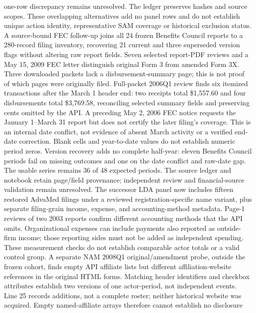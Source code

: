one-row discrepancy remains unresolved. The ledger
preserves hashes and source scopes. These overlapping alternatives add no
panel rows and do not establish unique action identity, representative SAM
coverage or historical exclusion status.
A source-bound FEC follow-up joins all 24 frozen Benefits Council reports to a
280-record filing inventory, recovering 21 current and three superseded version
flags without altering raw report fields. Seven selected report-PDF reviews and
a May 15, 2009 FEC letter distinguish original Form 3 from amended Form 3X.
Three downloaded packets lack a disbursement-summary page; this is not proof of
which pages were originally filed. Full-packet 2006Q1 review finds six itemized
transactions after the March 1 header end: two receipts total \$1,557.60 and
four disbursements total \$3,769.58, reconciling selected summary fields and
preserving cents omitted by the API. A preceding May 2, 2006 FEC notice requests
the January 1--March 31 report but does not certify the later filing's coverage.
This is an internal date conflict, not evidence of absent March activity or a
verified end-date correction. Blank cells and year-to-date values do not establish
numeric period zeros. Version recovery adds no complete half-year: eleven
Benefits Council periods fail on missing outcomes and one on the date conflict
and raw-date gap. The usable series remains 36 of 48
expected periods. The source ledger and notebook retain page/field provenance;
independent review and financial-source validation remain unresolved.
The successor LDA panel now includes fifteen restored AdvaMed filings under a
reviewed registration-specific name variant, plus separate filing-grain income,
expense, and accounting-method metadata. Page-1 reviews of two 2003 reports
confirm different accounting methods that the API omits. Organizational expenses
can include payments also reported as outside-firm income; those reporting sides
must not be added as independent spending. These measurement checks do not
establish comparable actor totals or a valid control group.
A separate NAM 2008Q1 original/amendment probe, outside the frozen cohort,
finds empty API affiliate lists but different affiliation-website references
in the original HTML forms. Matching header identifiers and checkbox attributes
establish two versions of one actor-period, not independent events. Line 25
records additions, not a complete roster; neither historical website was
acquired. Empty named-affiliate arrays therefore cannot establish no disclosure
